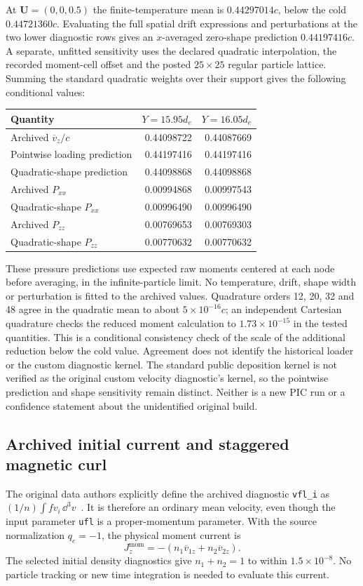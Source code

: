 At $\mathbf U=(0,0,0.5)$ the finite-temperature mean is $0.44297014c$,
below the cold $0.44721360c$. Evaluating the full spatial drift expressions
and perturbations at the two lower diagnostic rows gives an $x$-averaged
zero-shape prediction $0.44197416c$. A separate, unfitted sensitivity uses
the declared quadratic interpolation, the recorded moment-cell offset and
the posted $25\times25$ regular particle lattice. Summing the standard
quadratic weights over their support gives the following conditional values:
\begin{center}
\begin{tabular}{lrr}
\toprule
Quantity & $Y=15.95d_e$ & $Y=16.05d_e$ \\
\midrule
Archived $\overline v_z/c$ & 0.44098722 & 0.44087669 \\
Pointwise loading prediction & 0.44197416 & 0.44197416 \\
Quadratic-shape prediction & 0.44098868 & 0.44098868 \\
Archived $P_{xx}$ & 0.00994868 & 0.00997543 \\
Quadratic-shape $P_{xx}$ & 0.00996490 & 0.00996490 \\
Archived $P_{zz}$ & 0.00769653 & 0.00769303 \\
Quadratic-shape $P_{zz}$ & 0.00770632 & 0.00770632 \\
\bottomrule
\end{tabular}
\end{center}
These pressure predictions use expected raw moments centered at each node
before averaging, in the infinite-particle limit. No temperature, drift,
shape width or perturbation is fitted to the archived values. Quadrature
orders 12, 20, 32 and 48 agree in the quadratic mean to about
$5\times10^{-16}c$; an independent Cartesian quadrature checks the reduced
moment calculation to $1.73\times10^{-15}$ in the tested quantities.
This is a conditional consistency check of the scale of the additional
reduction below the cold value. Agreement does not identify the historical
loader or the custom diagnostic kernel.
The standard public deposition kernel is not verified as the original
custom velocity diagnostic's kernel, so the pointwise prediction and shape
sensitivity remain distinct. Neither is a new PIC run or a confidence
statement about the unidentified original build.

\subsection{Archived initial current and staggered magnetic curl}
The original data authors explicitly define the archived diagnostic
\texttt{vfl\_i} as $(1/n)\int f v_i\,\dd^3v$~\cite{dataset}.
It is therefore an ordinary mean velocity, even though the input parameter
\texttt{ufl} is a proper-momentum parameter. With the source normalization
$q_e=-1$, the physical moment current is
\begin{equation}
 J_z^{\mathrm{mom}}=-\left(n_1\overline v_{1z}+n_2\overline v_{2z}\right).
 \label{eq:archived-moment-current}
\end{equation}
The selected initial density diagnostics give $n_1+n_2=1$ to within
$1.5\times10^{-8}$. No particle tracking or new time integration is needed
to evaluate this current.

